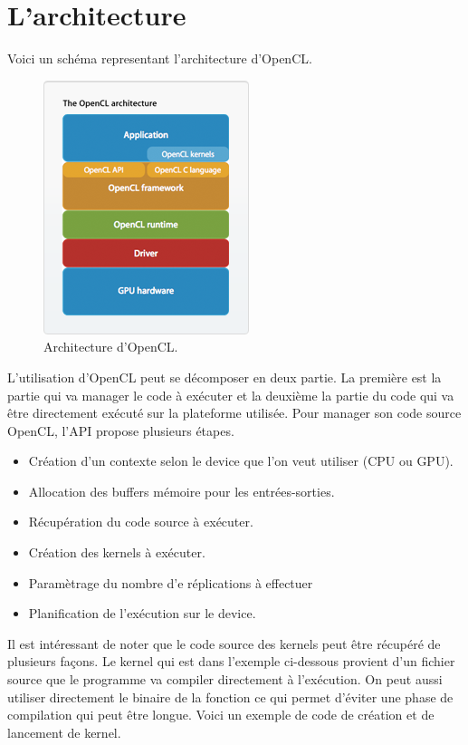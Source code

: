 \documentclass[a4paper,11pt]{report}
\begin{document}
{\section{L'architecture}

\normalsize{
Voici un schéma representant l'architecture d'OpenCL.
}

\begin{figure}[h]
   \begin{center}
   \includegraphics[scale = 0.60]{opencl_archi.png}
   \end{center}
  \caption{Architecture d'OpenCL.}
\end{figure}


\normalsize{
L'utilisation d'OpenCL peut se décomposer en deux partie. La première est la partie qui va manager le code à exécuter et la deuxième la partie du code qui va être directement exécuté sur la plateforme utilisée. Pour manager son code source OpenCL, l'API propose plusieurs étapes.\\
}

\begin{itemize}
\item Création d'un contexte selon le device que l'on veut utiliser (CPU ou GPU).
\item Allocation des buffers mémoire pour les entrées-sorties.
\item Récupération du code source à exécuter.
\item Création des kernels à exécuter.
\item Paramètrage du nombre d'e réplications à effectuer
\item Planification de l'exécution sur le device.\\
\end{itemize}

\normalsize{
Il est intéressant de noter que le code source des kernels peut être récupéré de plusieurs façons. Le kernel qui est dans l'exemple ci-dessous provient d'un fichier source que le programme va compiler directement à l'exécution. On peut aussi utiliser directement le binaire de la fonction ce qui permet d'éviter une phase de compilation qui peut être longue. Voici un exemple de code de création et de lancement de kernel. 
}

}
\end{document}
